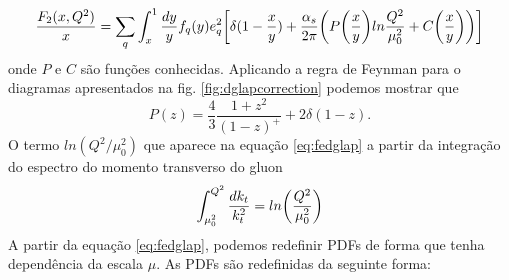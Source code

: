  \begin{equation}
     \frac{F_2(x,Q^2)}{x} = \sum_q  \int^1_x \frac{dy}{y} f_q(y) e_q^2  \qty[\delta(1-\frac{x}{y}) + \frac{\alpha_s}{2\pi}\qty(P\qty(\frac{x}{y})ln\frac{Q^2}{\mu_0^2} + C\qty(\frac{x}{y}))]
     \label{eq:fedglap}
 \end{equation}
 onde $P$ e $C$ são funções conhecidas. Aplicando a regra de Feynman para o diagramas apresentados na fig. \eqref{fig:dglapcorrection}  podemos mostrar que 
 \begin{equation}
     P(z) = \frac{4}{3} \frac{1+z^2}{(1-z)^+} + 2\delta(1-z).
 \end{equation}
 O termo $ln(Q^2/\mu_0^2)$ que aparece na equação \eqref{eq:fedglap} a partir da integração do espectro do momento transverso do gluon 
 \begin{equation}
     \int^{Q^2}_{\mu_0^2} \frac{dk_t}{k_t^2} = ln\qty(\frac{Q^2}{\mu_0^2})
 \end{equation}
 A partir da equação \eqref{eq:fedglap}, podemos redefinir PDFs de forma que tenha dependência da escala $\mu$. As PDFs são redefinidas da seguinte forma:
 
